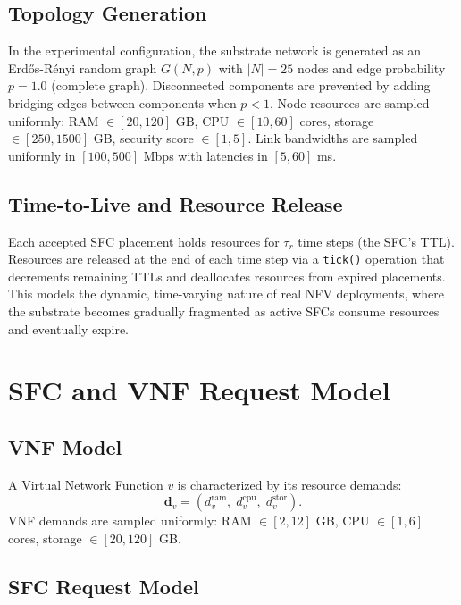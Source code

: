 \subsection{Topology Generation}

In the experimental configuration, the substrate network is generated as an Erd\H{o}s-R\'enyi random graph $G(N, p)$ with $|N| = 25$ nodes and edge probability $p = 1.0$ (complete graph). Disconnected components are prevented by adding bridging edges between components when $p < 1$. Node resources are sampled uniformly: RAM $\in [20, 120]$ GB, CPU $\in [10, 60]$ cores, storage $\in [250, 1500]$ GB, security score $\in [1, 5]$. Link bandwidths are sampled uniformly in $[100, 500]$ Mbps with latencies in $[5, 60]$ ms.

\subsection{Time-to-Live and Resource Release}

Each accepted SFC placement holds resources for $\tau_r$ time steps (the SFC's TTL). Resources are released at the end of each time step via a \texttt{tick()} operation that decrements remaining TTLs and deallocates resources from expired placements. This models the dynamic, time-varying nature of real NFV deployments, where the substrate becomes gradually fragmented as active SFCs consume resources and eventually expire.

\section{SFC and VNF Request Model}

\subsection{VNF Model}

A Virtual Network Function $v$ is characterized by its resource demands:
\begin{equation}
\mathbf{d}_v = \left(d_v^{\text{ram}},\; d_v^{\text{cpu}},\; d_v^{\text{stor}}\right).
\end{equation}
VNF demands are sampled uniformly: RAM $\in [2, 12]$ GB, CPU $\in [1, 6]$ cores, storage $\in [20, 120]$ GB.

\subsection{SFC Request Model}

